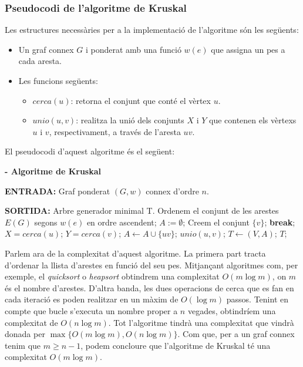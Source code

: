 \documentclass{article}
\renewcommand{\algorithmicrequire}{\textbf{ENTRADA: }}
\renewcommand{\algorithmicensure}{\textbf{SORTIDA: }}
\begin{document}
\subsubsection{Pseudocodi de l'algoritme de Kruskal}
Les estructures necessàries per a la implementació de l'algoritme són les següents: 
\begin{itemize}
    \item Un graf connex $G$ i ponderat amb una funció $w(e)$ que assigna un pes a cada aresta.
    \item Les funcions següents:
    \begin{itemize}
        \item $cerca (u)$: retorna el conjunt que conté el vèrtex $u$.
        \item $unio (u,v)$: realitza la unió dels conjunts $X$ i $Y$ que contenen els vèrtexs $u$ i $v$, respectivament, a través de l'aresta $uv$.
    \end{itemize}
\end{itemize}
El pseudocodi d'aquest algoritme és el següent: 
\begin{algorithm}[H]
\caption{\textbf{- Algoritme de Kruskal}}
\begin{algorithmic}
\item \algorithmicrequire{Graf ponderat $(G,w)$ connex d’ordre $n$.}
\item \algorithmicensure{Arbre generador minimal T.}
\State
\State Ordenem el conjunt de les arestes $E(G)$ segons $w(e)$ en ordre ascendent;
\State $A:=\emptyset$;
\State Creem el conjunt $\{v\}$;
\EndFor
{}
\State\textbf{break};
\EndIf
\State $X=cerca(u)$;
\State $Y=cerca(v)$;
\State $A\gets A\cup \{uv\}$;
\State $unio(u,v)$;
\EndIf
\EndFor
\State $T\gets (V,A)$;
\State \Return $T$;
\end{algorithmic}
\end{algorithm}
\par \cite{7} \cite{8} 
\par
Parlem ara de la complexitat d'aquest algoritme. La primera part tracta d’ordenar la llista d’arestes en funció del seu pes. Mitjançant algoritmes com, per exemple, el \textit{quicksort} o \textit{heapsort} obtindrem una complexitat $O(m\log m)$, on $m$ és el nombre d’arestes. D'altra banda, les dues operacions de cerca que es fan en cada iteració es poden realitzar en un màxim de $O(\log m)$ passos. Tenint en compte que bucle s'executa un nombre proper a $n$ vegades, obtindríem una complexitat de $O(n\log m)$.
Tot l’algoritme tindrà una complexitat que vindrà donada per $\max\{O(m\log m),O(n\log m)\}$. Com que, per a un graf connex tenim que $m\geq n-1$, podem concloure que l’algoritme de Kruskal té una complexitat $O(m\log m)$.\par
\end{document}
